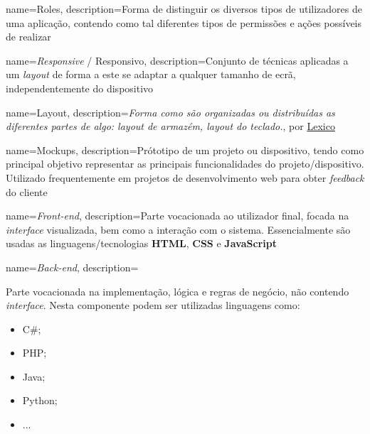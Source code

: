 










{
    name=Roles,
    description={Forma de distinguir os diversos tipos de utilizadores de uma aplicação, contendo como tal diferentes tipos de permissões e ações possíveis de realizar}
}

{
    name=\textit{Responsive} / Responsivo,
    description={Conjunto de técnicas aplicadas a um \textit{layout} de forma a este se adaptar a qualquer tamanho de ecrã, independentemente do dispositivo}
}

{
    name=Layout,
	description={\textit{Forma como são organizadas ou distribuídas as diferentes partes de algo: layout de armazém, layout do teclado.}, por \href{https://www.lexico.pt/layout/}{Lexico}}
}

{
    name=Mockups,
	description={Prótotipo de um projeto ou dispositivo, tendo como principal objetivo representar as principais funcionalidades do projeto/dispositivo. Utilizado frequentemente em projetos de desenvolvimento web para obter \textit{feedback} do cliente}
}

{
    name=\textit{Front-end},
	description={Parte vocacionada ao utilizador final, focada na \textit{interface} visualizada, bem como a interação com o sistema. Essencialmente são usadas as linguagens/tecnologias \textbf{HTML}, \textbf{CSS} e \textbf{JavaScript}}
}

{
    name=\textit{Back-end},
	description={Parte vocacionada na implementação, lógica e regras de negócio, não contendo \textit{interface}. Nesta componente podem ser utilizadas linguagens como:
	\begin{itemize}
		\item C\#;
		\item PHP;
		\item Java;
		\item Python;
		\item ...
	\end{itemize}}
}

